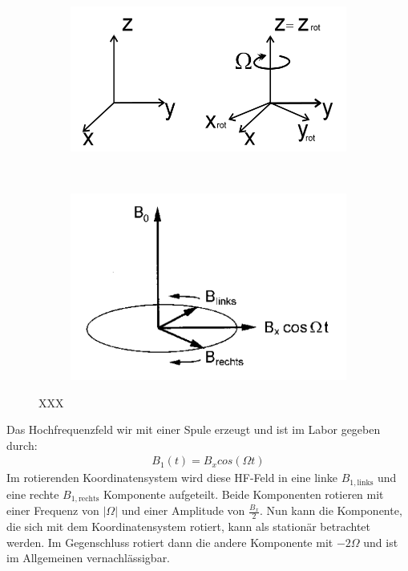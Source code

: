 \begin{figure}[hbtp]
\centering
	\begin{subfigure}[c]{0.4\textwidth}
	\includegraphics[width=\textwidth]{Plots/rotKoordinatensystem.png} 
	\subcaption{}
	\end{subfigure}
	~
	~
	\begin{subfigure}[c]{0.3\textwidth}
	\includegraphics[width=\textwidth]{Plots/B1Felder.png}
	\subcaption{}
	\end{subfigure}
\caption{XXX}
\label{rotKoordi}
\end{figure}

Das Hochfrequenzfeld wir mit einer Spule erzeugt und ist im Labor gegeben durch:
\begin{align}
	B_1(t) = B_x cos(\Omega t)
\end{align}
Im rotierenden Koordinatensystem wird diese HF-Feld in eine linke $B_{1,\text{links}}$ und eine rechte $B_{1,\text{rechts}}$ Komponente aufgeteilt.
Beide Komponenten rotieren mit einer Frequenz von $|\Omega|$ und einer Amplitude von $\frac{B_x}{2}$.
Nun kann die Komponente, die sich mit dem Koordinatensystem rotiert, kann als station\"{a}r betrachtet werden.
Im Gegenschluss rotiert dann die andere Komponente mit $-2\Omega$ und ist im Allgemeinen vernachl\"{a}ssigbar.

